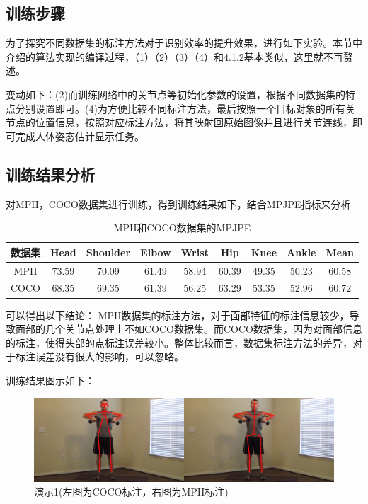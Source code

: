 \subsection{训练步骤}

为了探究不同数据集的标注方法对于识别效率的提升效果，进行如下实验。本节中介绍的算法实现的编译过程，（1）（2）（3）（4）和4.1.2基本类似，这里就不再赘述。

变动如下：(2)而训练网络中的关节点等初始化参数的设置，根据不同数据集的特点分别设置即可。(4)为方便比较不同标注方法，最后按照一个目标对象的所有关节点的位置信息，按照对应标注方法，将其映射回原始图像并且进行关节连线，即可完成人体姿态估计显示任务。

\subsection{训练结果分析}

对MPII，COCO数据集进行训练，得到训练结果如下，结合MPJPE指标来分析

\begin{table}[]
    \centering
    \begin{tabular}{c|c|c|c|c|c|c|c|c}
        \hline
         数据集 & Head & Shoulder	& Elbow	& Wrist	& Hip & Knee & Ankle & Mean\\
        \hline
         MPII & 73.59 & 70.09 & 61.49 & 58.94 & 60.39 & 49.35 & 50.23 & 60.58\\
        \hline
         COCO & 68.35 & 69.35 & 61.39 & 56.25 & 63.29 & 53.35 & 52.96 & 60.72\\
        \hline
    \end{tabular}
    \caption{MPII和COCO数据集的MPJPE}
    \label{com_dataset}
\end{table}

可以得出以下结论：
MPII数据集的标注方法，对于面部特征的标注信息较少，导致面部的几个关节点处理上不如COCO数据集。而COCO数据集，因为对面部信息的标注，使得头部的点标注误差较小。整体比较而言，数据集标注方法的差异，对于标注误差没有很大的影响，可以忽略。

训练结果图示如下：

\begin{figure}[h]
	\includegraphics[width=\textwidth]{pic/vs_1.jpg}
	\caption{演示1(左图为COCO标注，右图为MPII标注)}
	\label{vs_1}
\end{figure}

